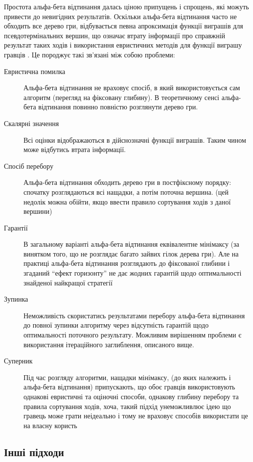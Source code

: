 \documentclass[12pt,a4paper]{article}
\begin{document}
Простота альфа-бета відтинання далась ціною припущень і спрощень, які можуть
привести до невигідних результатів. Оскільки альфа-бета відтинання часто не
обходить все дерево гри, відбувається певна апроксимація функції виграшів для
псевдотермінальних вершин, що означає втрату інформації про справжній
результат таких ходів і використання евристичних методів для функції виграшу
гравців \cite{altern}. Це породжує такі зв'язані між собою проблеми:

\begin{description}
\item[Евристична помилка] Альфа-бета відтинання не враховує спосіб, в який
  використовується сам алгоритм (перегляд на фіксовану глибину). В
  теоретичному сенсі альфа-бета відтинання повинно повністю розглянути дерево гри.
\item[Скалярні значення] Всі оцінки відображаються в дійснозначні функції
  виграшів. Таким чином може відбутись втрата інформації.
\item[Спосіб перебору] Альфа-бета відтинання обходить дерево гри в
  постфіксному порядку: спочатку розглядаються всі нащадки, а потім поточна
  вершина. (цей недолік можна обійти, якщо ввести правило сортування ходів з
  даної вершини)
\item[Гарантії] В загальному варіанті альфа-бета відтинання еквівалентне
  мінімаксу (за винятком того, що не розглядає багато зайвих гілок дерева
  гри). Але на практиці альфа-бета відтинання розглядають до фіксованої
  глибини і згаданий ``ефект горизонту'' не дає жодних гарантій щодо
  оптимальності знайденої найкращої стратегії
\item[Зупинка] Неможливість скористатись результатами перебору альфа-бета
  відтинання до повної зупинки алгоритму через відсутність гарантій щодо
  оптимальності поточного результату. Можливим вирішенням проблеми є
  використання ітераційного заглиблення, описаного вище.
\item[Суперник] Під час розгляду алгоритми, нащадки мінімаксу, (до яких
  належить і альфа-бета відтинання) припускають, що обоє гравців
  використовують однакові евристичні та оціночні способи, однакову глибину
  перебору та правила сортування ходів, хоча, такий підхід унеможливлює ідею
  що гравець може грати неідеально і тому не враховує способів використати це
  на власну користь
\end{description}

\subsection{Інші підходи}
\end{document}
